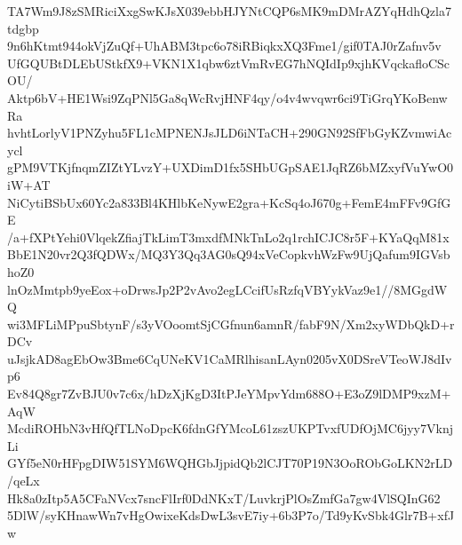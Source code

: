 TA7Wm9J8zSMRiciXxgSwKJsX039ebbHJYNtCQP6sMK9mDMrAZYqHdhQzla7tdgbp
9n6hKtmt944okVjZuQf+UhABM3tpc6o78iRBiqkxXQ3Fme1/gif0TAJ0rZafnv5v
UfGQUBtDLEbUStkfX9+VKN1X1qbw6ztVmRvEG7hNQIdIp9xjhKVqckafloCScOU/
Aktp6bV+HE1Wsi9ZqPNl5Ga8qWcRvjHNF4qy/o4v4wvqwr6ci9TiGrqYKoBenwRa
hvhtLorlyV1PNZyhu5FL1cMPNENJsJLD6iNTaCH+290GN92SfFbGyKZvmwiAcycl
gPM9VTKjfnqmZIZtYLvzY+UXDimD1fx5SHbUGpSAE1JqRZ6bMZxyfVuYwO0iW+AT
NiCytiBSbUx60Yc2a833Bl4KHlbKeNywE2gra+KcSq4oJ670g+FemE4mFFv9GfGE
/a+fXPtYehi0VlqekZfiajTkLimT3mxdfMNkTnLo2q1rchICJC8r5F+KYaQqM81x
BbE1N20vr2Q3fQDWx/MQ3Y3Qq3AG0sQ94xVeCopkvhWzFw9UjQafum9IGVsbhoZ0
lnOzMmtpb9yeEox+oDrwsJp2P2vAvo2egLCcifUsRzfqVBYykVaz9e1//8MGgdWQ
wi3MFLiMPpuSbtynF/s3yVOoomtSjCGfnun6amnR/fabF9N/Xm2xyWDbQkD+rDCv
uJsjkAD8agEbOw3Bme6CqUNeKV1CaMRlhisanLAyn0205vX0DSreVTeoWJ8dIvp6
Ev84Q8gr7ZvBJU0v7c6x/hDzXjKgD3ItPJeYMpvYdm688O+E3oZ9lDMP9xzM+AqW
McdiROHbN3vHfQfTLNoDpcK6fdnGfYMcoL61zszUKPTvxfUDfOjMC6jyy7VknjLi
GYf5eN0rHFpgDIW51SYM6WQHGbJjpidQb2lCJT70P19N3OoRObGoLKN2rLD/qeLx
Hk8a0zItp5A5CFaNVcx7sncFlIrf0DdNKxT/LuvkrjPlOsZmfGa7gw4VlSQInG62
5DlW/syKHnawWn7vHgOwixeKdsDwL3svE7iy+6b3P7o/Td9yKvSbk4Glr7B+xfJw
